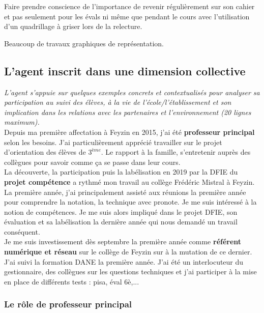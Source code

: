 \documentclass[11pt]{article}
\begin{document}
Faire prendre conscience de l'importance de revenir régulièrement sur son cahier et pas seulement pour les évals ni même que pendant le cours avec l'utilisation d'un quadrillage à griser lors de la relecture. 

Beaucoup de travaux graphiques de représentation. 

\newpage

\subsection{L’agent inscrit dans une dimension collective}

\textit{L’agent s’appuie sur quelques exemples concrets et contextualisés pour analyser sa participation au suivi des élèves, à la vie de l’école/l’établissement et son implication dans les relations avec les partenaires et l’environnement (20 lignes maximum).}\\

Depuis ma première affectation à Feyzin en 2015, j’ai été \textbf{professeur principal} selon les besoins. J'ai particulièrement apprécié travailler sur le projet d’orientation des élèves de $3^{ème}$. Le rapport à la famille, s'entretenir auprès des collègues pour savoir comme ça se passe dans leur cours.\\

La découverte, la participation puis la labélisation en 2019 par la DFIE du \textbf{projet compétence} a rythmé mon travail au collège Frédéric Mistral à Feyzin. La première année, j'ai principalement assisté aux réunions la première année pour comprendre la notation, la technique avec pronote. Je me suis intéressé à la notion de compétences. Je me suis alors impliqué dans le projet DFIE, son évaluation et sa labélisation la dernière année qui nous demandé un travail conséquent.\\

Je me suis investissement dès septembre la première année comme \textbf{référent numérique et réseau} sur le collège de Feyzin sur à la mutation de ce dernier. J'ai suivi la formation DANE la première année. J'ai été un interlocuteur du gestionnaire, des collègues sur les questions techniques et j'ai participer à la mise en place de différents tests : pisa, éval 6è,...\\

\subsubsection{Le rôle de professeur principal}
\end{document}

